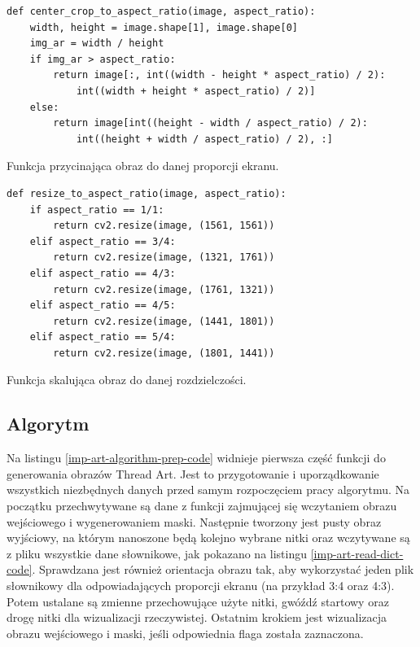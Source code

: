         \begin{code}[H]
        \begin{verbatim}
def center_crop_to_aspect_ratio(image, aspect_ratio):
    width, height = image.shape[1], image.shape[0]
    img_ar = width / height
    if img_ar > aspect_ratio:
        return image[:, int((width - height * aspect_ratio) / 2):
            int((width + height * aspect_ratio) / 2)]
    else:
        return image[int((height - width / aspect_ratio) / 2):
            int((height + width / aspect_ratio) / 2), :]
        \end{verbatim}
        \caption{Funkcja przycinająca obraz do danej proporcji ekranu.}
        \label{imp-art-input-crop-code}
        \end{code}
        
        \begin{code}[H]
        \begin{verbatim}
def resize_to_aspect_ratio(image, aspect_ratio):
    if aspect_ratio == 1/1:
        return cv2.resize(image, (1561, 1561))
    elif aspect_ratio == 3/4:
        return cv2.resize(image, (1321, 1761))
    elif aspect_ratio == 4/3:
        return cv2.resize(image, (1761, 1321))
    elif aspect_ratio == 4/5:
        return cv2.resize(image, (1441, 1801))
    elif aspect_ratio == 5/4:
        return cv2.resize(image, (1801, 1441))
        \end{verbatim}
        \caption{Funkcja skalująca obraz do danej rozdzielczości.}
        \label{imp-art-input-resize-code}
        \end{code}
        
        \subsection{Algorytm} \label{imp-art-alg}
        Na listingu \ref{imp-art-algorithm-prep-code} widnieje pierwsza część funkcji do generowania obrazów Thread Art. Jest to przygotowanie i uporządkowanie wszystkich niezbędnych danych przed samym rozpoczęciem pracy algorytmu. Na początku przechwytywane są dane z funkcji zajmującej się wczytaniem obrazu wejściowego i wygenerowaniem maski. Następnie tworzony jest pusty obraz wyjściowy, na którym nanoszone będą kolejno wybrane nitki oraz wczytywane są z pliku wszystkie dane słownikowe, jak pokazano na listingu \ref{imp-art-read-dict-code}. Sprawdzana jest również orientacja obrazu tak, aby wykorzystać jeden plik słownikowy dla odpowiadających proporcji ekranu (na przykład 3:4 oraz 4:3). Potem ustalane są zmienne przechowujące użyte nitki, gwóźdź startowy oraz drogę nitki dla wizualizacji rzeczywistej. Ostatnim krokiem jest wizualizacja obrazu wejściowego i maski, jeśli odpowiednia flaga została zaznaczona. 
        
